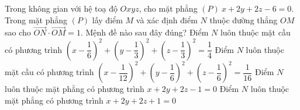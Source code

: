 \begin{ex}%
	Trong không gian với hệ toạ độ $ Oxyz $, cho mặt phẳng $ (P)\ x + 2y + 2z - 6 = 0 $. Trong mặt phẳng $ (P) $ lấy điểm $ M $ và xác định điểm $ N $  thuộc đường thẳng $ OM $ sao cho $ \overrightarrow{ON}\cdot \overrightarrow{OM} = 1 $. Mệnh đề nào sau đây đúng?
	\choice
	{Điểm $ N $ luôn thuộc mặt cầu có phương trình $ \left (x - \dfrac{1}{6} \right )^2 + \left (y - \dfrac{1}{3} \right )^2 + \left (z - \dfrac{1}{3} \right )^2  = \dfrac{1}{4}$}
	{\True Điểm $ N $ luôn thuộc mặt cầu có phương trình $ \left (x - \dfrac{1}{12} \right )^2 + \left (y - \dfrac{1}{6} \right )^2 + \left (z - \dfrac{1}{6} \right )^2  = \dfrac{1}{16}$}
	{Điểm $ N $ luôn thuộc mặt phẳng có phương trình $ x + 2y + 2z - 1 = 0 $}
	{Điểm $ N $ luôn thuộc mặt phẳng có phương trình $ x + 2y + 2z + 1 = 0 $}
\end{ex}	

